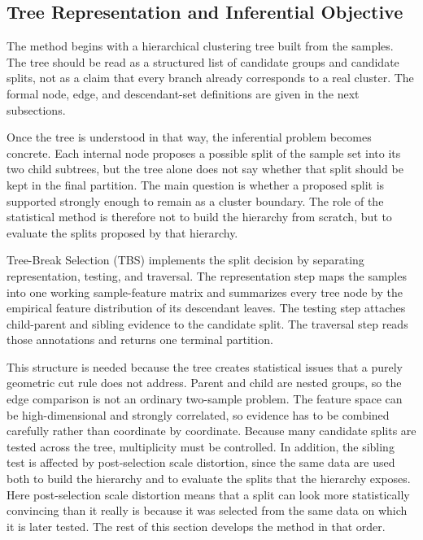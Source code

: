 
\subsection{Tree Representation and Inferential Objective}

The method begins with a hierarchical clustering tree built from the samples.
The tree should be read as a structured list of candidate groups and candidate
splits, not as a claim that every branch already corresponds to a real cluster.
The formal node, edge, and descendant-set definitions are given in the next
subsections.

Once the tree is understood in that way, the inferential problem becomes
concrete. Each internal node proposes a possible split of the sample set into
its two child subtrees, but the tree alone does not say whether that split
should be kept in the final partition. The main question is whether a proposed
split is supported strongly enough to remain as a cluster boundary. The role of
the statistical method is therefore not to build the hierarchy from scratch,
but to evaluate the splits proposed by that hierarchy.

Tree-Break Selection (TBS) implements the split decision by separating
representation, testing, and traversal. The representation step maps the
samples into one working
sample-feature matrix and summarizes every tree node by the empirical feature
distribution of its descendant leaves. The testing step attaches child-parent
and sibling evidence to the candidate split. The traversal step reads those
annotations and returns one terminal partition.

This structure is needed because the tree creates statistical issues that a
purely geometric cut rule does not address. Parent and child are nested groups,
so the edge comparison is not an ordinary two-sample problem. The feature space
can be high-dimensional and strongly correlated, so evidence has to be combined
carefully rather than coordinate by coordinate. Because many candidate splits
are tested across the tree, multiplicity must be controlled. In addition, the
sibling test is affected by post-selection scale distortion, since the same data are
used both to build the hierarchy and to evaluate the splits that the hierarchy
exposes. Here post-selection scale distortion means that a split can look more
statistically convincing than it really is because it was selected from the
same data on which it is later tested. The rest of this section develops the
method in that order.

